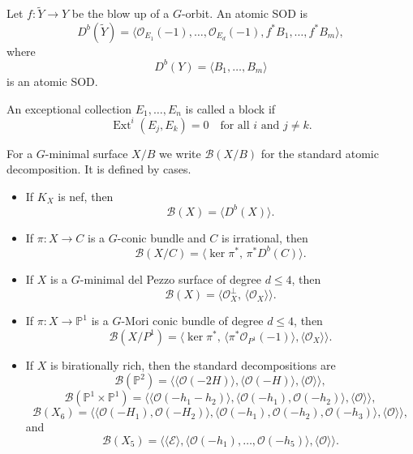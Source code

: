 \begin{remark}
\label{remark-let-f}
Let $f:\widetilde Y\to Y$ be the blow
up of a $G$-orbit.
An atomic SOD is
\[
D^b(\widetilde Y)
=\langle
\mathcal O_{E_1}(-1),\dots,
\mathcal O_{E_d}(-1),
f^*B_1,\dots,f^*B_m
\rangle,
\]
where
\[
D^b(Y)=\langle B_1,\dots,B_m\rangle
\]
is an atomic SOD.
\end{remark}

\begin{definition}
\label{definition-exceptional}
An exceptional collection
$E_1,\dots,E_n$ is called a block if
\[
\operatorname{Ext}^i(E_j,E_k)=0
\quad\text{for all }i\text{ and }j\neq k.
\]
\end{definition}

\begin{remark}
\label{remark-g-minimal}
For a $G$-minimal surface $X/B$ we
write $\mathcal B(X/B)$ for the
standard atomic decomposition.
It is defined by cases.
\begin{itemize}
\item If $K_X$ is nef, then
\[
\mathcal B(X)=\langle D^b(X)\rangle.
\]
\item If $\pi:X\to C$ is a $G$-conic
bundle and $C$ is irrational, then
\[
\mathcal B(X/C)=\langle
\ker \pi^*,\,
\pi^*D^b(C)\rangle.
\]
\item If $X$ is a $G$-minimal del
Pezzo surface of degree $d\leq 4$,
then
\[
\mathcal B(X)
=\langle
\mathcal O_X^\perp,\,
\langle\mathcal O_X\rangle
\rangle.
\]
\item If $\pi:X\to\mathbb P^1$ is a
$G$-Mori conic bundle of degree
$d\leq 4$, then
\[
\mathcal B(X/P^1)
=\langle
\ker \pi^*,\,
\langle\pi^*\mathcal O_{P^1}(-1)\rangle,
\langle\mathcal O_X\rangle
\rangle.
\]
\item If $X$ is birationally rich,
then the standard decompositions are
\[
\mathcal B(\mathbb P^2)
=\langle
\langle\mathcal O(-2H)\rangle,
\langle\mathcal O(-H)\rangle,
\langle\mathcal O\rangle
\rangle,
\]
\[
\mathcal B(\mathbb P^1\times\mathbb P^1)
=\langle
\langle\mathcal O(-h_1-h_2)\rangle,
\langle\mathcal O(-h_1),
\mathcal O(-h_2)\rangle,
\langle\mathcal O\rangle
\rangle,
\]
\[
\mathcal B(X_6)
=\langle
\langle\mathcal O(-H_1),
\mathcal O(-H_2)\rangle,
\langle\mathcal O(-h_1),\mathcal O(-h_2),
\mathcal O(-h_3)\rangle,
\langle\mathcal O\rangle
\rangle,
\]
and
\[
\mathcal B(X_5)
=\langle
\langle\mathcal E\rangle,
\langle\mathcal O(-h_1),\dots,
\mathcal O(-h_5)\rangle,
\langle\mathcal O\rangle
\rangle.
\]
\end{itemize}
\end{remark}

